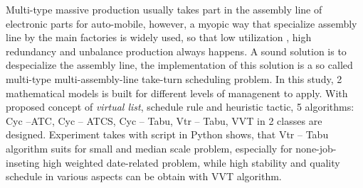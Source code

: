 Multi-type massive production usually takes part in the assembly line of electronic parts for auto-mobile, however, a myopic way that specialize assembly line by the main factories is widely used, so that low utilization , high redundancy and unbalance production always happens. A sound solution is to despecialize the assembly line, the implementation of this solution is a so called multi-type multi-assembly-line take-turn scheduling problem. In this study, 2 mathematical models is built for different levels of managenent to apply. With proposed concept of \textit{virtual list}, schedule rule and heuristic tactic, 5 algorithms: Cyc --ATC, Cyc -- ATCS, Cyc -- Tabu, Vtr -- Tabu, VVT in 2 classes are designed. Experiment takes with script in Python shows, that Vtr -- Tabu algorithm suits for small and median scale problem, especially for none-job-inseting high weighted date-related problem, while high stability and quality schedule in various aspects can be obtain with VVT algorithm.

